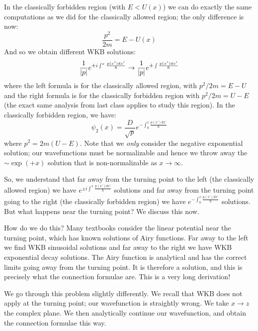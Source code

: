 In the classically forbidden region (with $E < U(x)$) we can do exactly the same computations as we did for the classically allowed region; the only difference is now:
\begin{equation}
    \frac{p^2}{2m} = E - U(x)
\end{equation}
And so we obtain different WKB solutions:
\begin{equation}
    \frac{1}{\lvert p \rvert}e^{\pm i \int^x \frac{p(x')dx'}{\hbar}} \to \frac{1}{\lvert p \rvert}e^{\pm \int \frac{p(x')dx'}{\hbar}}
\end{equation}
where the left formula is for the classically allowed region, with $p^2/2m = E - U$ and the right formula is for the classically forbidden region with $p^2/2m = U - E$ (the exact same analysis from last class applies to study this region). In the classically forbidden region, we have:
\begin{equation}
    \psi_2(x) = \frac{D}{\sqrt{p}}e^{-\int_0^x \frac{p(x')dx'}{\hbar}}
\end{equation}
where $p^2 = 2m(U-E)$. Note that we \emph{only} consider the negative exponential solution; our wavefunctions must be normalizable and hence we throw away the $\sim \exp(+x)$ solution that is non-normalizable as $x \to \infty$.

So, we understand that far away from the turning point to the left (the classically allowed region) we have $e^{\pm i \int^x \frac{p(x')dx'}{\hbar}}$ solutions and far away from the turning point going to the right (the classically forbidden region) we have $e^{-\int_0^x \frac{p(x')dx'}{\hbar}}$ solutions. But what happens near the turning point? We discuss this now.

How do we do this? Many textbooks consider the linear potential near the turning point, which has known solutions of Airy functions. Far away to the left we find WKB sinusoidal solutions and far away to the right we have WKB exponential decay solutions. The Airy function is analytical and has the correct limits going away from the turning point. It is therefore a solution, and this is precisely what the connection formulae are. This is a very long derivation!

We go through this problem slightly differently. We recall that WKB does not apply at the turning point; our wavefunction is straightly wrong. We take $x \to z$ the complex plane. We then analytically continue our wavefunction, and obtain the connection formulae this way.

